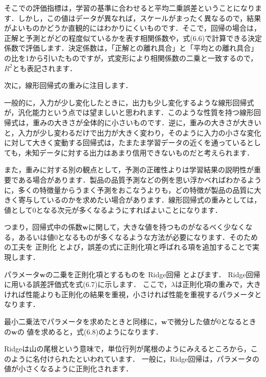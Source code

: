 そこでの評価指標は，学習の基準に合わせると平均二乗誤差ということになります．しかし，この値はデータが異なれば，スケールがまったく異なるので，結果がよいものかどうか直観的にはわかりにくいものです．そこで，回帰の場合は，正解と予測とがどの程度似ているかを表す相関係数や，式(6.6)で計算できる決定係数で評価します．決定係数は，「正解との離れ具合」と「平均との離れ具合」の比を1から引いたものですが，式変形により相関係数の二乗と一致するので，$R^2$とも表記されます．



次に，線形回帰式の重みに注目します．

一般的に，入力が少し変化したときに，出力も少し変化するような線形回帰式が，汎化能力という点では望ましいと思われます．このような性質を持つ線形回帰式は，重みの大きさが全体的に小さいものです．逆に，重みの大きさが大きいと，入力が少し変わるだけで出力が大きく変わり，そのように入力の小さな変化に対して大きく変動する回帰式は，たまたま学習データの近くを通っているとしても，未知データに対する出力はあまり信用できないものだと考えられます．

また，重みに対する別の観点として，予測の正確性よりは学習結果の説明性が重要である場合があります．製品の品質予測などの例を思い浮かべればわかるように，多くの特徴量からうまく予測をおこなうよりも，どの特徴が製品の品質に大きく寄与しているのかを求めたい場合があります．線形回帰式の重みとしては，値として0となる次元が多くなるようにすればよいことになります．

つまり，回帰式中の係数$\bm{w}$に関して，大きな値を持つものがなるべく少なくなる，あるいは値0となるものが多くなるような方法が必要になります．そのための工夫を
正則化
とよび，誤差の式に正則化項と呼ばれる項を追加することで実現します．

パラメータ$\bm{w}$の二乗を正則化項とするものを
Ridge回帰
とよびます．
Ridge回帰に用いる誤差評価式を式(6.7)に示します．
ここで，$\lambda$は正則化項の重みで，大きければ性能よりも正則化の結果を重視，小さければ性能を重視するパラメータとなります．


最小二乗法でパラメータを求めたときと同様に，$\bm{w}$で微分した値が0となるときの$\bm{w}$の
値を求めると，式(6.8)のようになります．


Ridgeは山の尾根という意味で，単位行列が尾根のようにみえるところから，このように名付けられたといわれています．
一般に，Ridge回帰は，パラメータの値が小さくなるように正則化されます．


